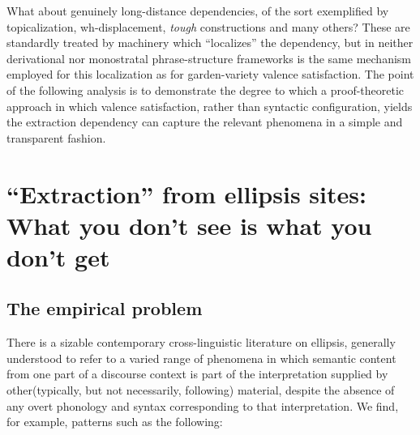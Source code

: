 \documentclass[output=paper,colorlinks,citecolor=brown]{langscibook}
\begin{document}
What about genuinely long-distance dependencies, of the sort
exemplified by topicalization, wh-displacement, \textit{tough}
constructions and many others? These are standardly treated by
machinery which ``localizes'' the dependency, but in neither
derivational nor monostratal phrase-structure frameworks is the same
mechanism employed for this localization as for garden-variety valence
satisfaction. The point of the following analysis is to demonstrate
the degree to which a proof-theoretic approach in which valence satisfaction,
rather than syntactic configuration, yields the extraction dependency
can capture the relevant phenomena in a simple and transparent fashion.

\section{``Extraction'' from ellipsis sites: What you don't see is what you don't get}
\label{sec-extraction}

\subsection{The empirical problem}

There is a sizable contemporary cross-linguistic literature on
ellipsis, generally understood to refer to a varied range of phenomena
in which semantic content from one part of a discourse context is
part of the interpretation supplied by other(typically, but
not necessarily, following)  material, despite the absence of any
overt phonology and syntax corresponding to that interpretation. We
find, for example, patterns such as the following:
\end{document}
